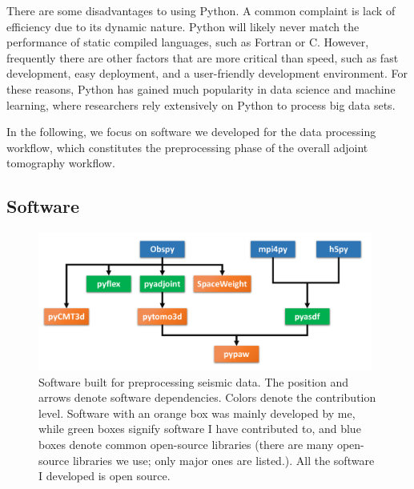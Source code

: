 There are some disadvantages to using Python.
A common complaint is lack of efficiency due to its dynamic nature.
Python will likely never match the performance of static compiled languages,
such as Fortran or C.
However,
frequently there are other factors that are more critical than speed,
such as fast development, easy deployment, and a user-friendly development environment.
For these reasons, Python has gained much popularity in data science and machine learning, where researchers rely extensively on Python to process big data sets.

In the following, we focus on software we developed
for the data processing workflow, which constitutes the preprocessing phase of the overall adjoint tomography workflow.

\subsection{Software}

\begin{figure}
  \centering
  \includegraphics[width=0.98\textwidth]{ch-tools/figures/data_processing_software.pdf}
  \caption[software built for preprocessing seismic data]
  {\small{Software built for preprocessing seismic data. The position and arrows denote software dependencies. Colors denote the contribution level. Software with
  an orange box was mainly developed by me, while green boxes signify software I have contributed to, and blue boxes denote common open-source libraries (there are many open-source libraries we use; only major ones are listed.). All the software I developed is open source.}}
  \label{fig:preprocess_software}
\end{figure}


